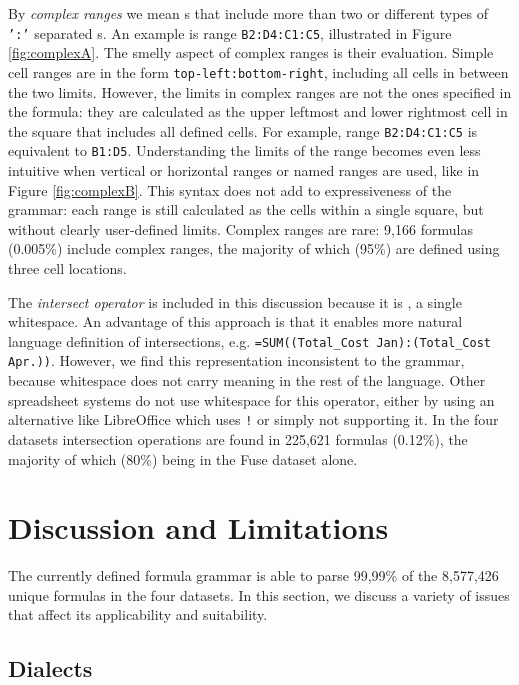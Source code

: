 \documentclass[times]{smrauth}
\begin{document}
By \textit{complex ranges} we mean s that include more than two or different types of \texttt{':'} separated s. An example is range \texttt{B2:D4:C1:C5}, illustrated in Figure \ref{fig:complexA}. The smelly aspect of complex ranges is their evaluation. Simple cell ranges are in the form \texttt{top-left:bottom-right}, including all cells in between the two limits. However, the limits in complex ranges are not the ones specified in the formula: they are calculated as the upper leftmost and lower rightmost cell in the square that includes all defined cells. For example, range \texttt{B2:D4:C1:C5} is equivalent to \texttt{B1:D5}. Understanding the limits of the range becomes even less intuitive when vertical or horizontal ranges or named ranges are used, like in Figure \ref{fig:complexB}. This syntax does not add to expressiveness of the grammar: each range is still calculated as the cells within a single square, but without clearly user-defined limits. Complex ranges are rare: 9,166 formulas (0.005\%) include complex ranges, the majority of which (95\%) are defined using three cell locations.

The \textit{intersect operator} is included in this discussion because it is \texttt{}, a single whitespace.
An advantage of this approach is that it enables more natural language definition of intersections, e.g. \texttt{=SUM((Total_Cost Jan):(Total_Cost Apr.))}.
However, we find this representation inconsistent to the grammar, because whitespace does not carry meaning in the rest of the language. Other spreadsheet systems do not use whitespace for this operator, either by using an alternative like LibreOffice which uses \texttt{!} or simply not supporting it. In the four datasets intersection operations are found in 225,621	formulas (0.12\%), the majority of which (80\%) being in the Fuse dataset alone.

\section{Discussion and Limitations}
\label{sec:discussion}
The currently defined formula grammar is able to parse 99,99\% of the 8,577,426 unique formulas in the four datasets. In this section, we discuss a variety of issues that affect its applicability and suitability.

\subsection{Dialects}
\end{document}
